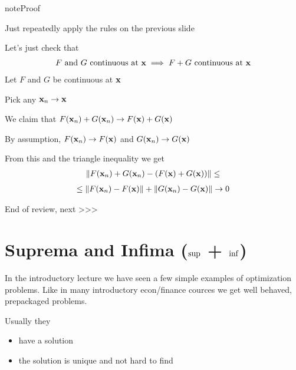 \documentclass[letterpaper,10pt,english]{jupyterBook}
\begin{document}
\begin{sphinxadmonition}{note}{Proof}

\sphinxAtStartPar
Just repeatedly apply the rules on the previous slide

\sphinxAtStartPar
Let’s just check that
\begin{equation*}
\begin{split}
%
\text{$F$ and $G$ continuous at ${\bf x}$}
\implies 
\text{$F + G$ continuous at ${\bf x}$}
%
\end{split}
\end{equation*}
\sphinxAtStartPar
Let \(F\) and \(G\) be continuous at \({\bf x}\)

\sphinxAtStartPar
Pick any \({\bf x}_n \to {\bf x}\)

\sphinxAtStartPar
We claim that
\(F({\bf x}_n) + G({\bf x}_n) \to F({\bf x}) + G({\bf x})\)

\sphinxAtStartPar
By assumption, \(F({\bf x}_n) \to F({\bf x})\) and \(G({\bf x}_n) \to G({\bf x})\)

\sphinxAtStartPar
From this and the triangle inequality we get
\begin{equation*}
\begin{split}
%
\| F({\bf x}_n) + G({\bf x}_n) - (F({\bf x}) + G({\bf x})) \|
\leq 
%
\end{split}
\end{equation*}\begin{equation*}
\begin{split}
%
\leq 
\| F({\bf x}_n) - F({\bf x}) \|
+
\| G({\bf x}_n) - G({\bf x}) \|
\to 0
%
\end{split}
\end{equation*}\end{sphinxadmonition}

\sphinxAtStartPar
End of review,  next >>>


\section{Suprema and Infima (\protect\(\mathrm{sup}\protect\) + \protect\(\mathrm{inf}\protect\))}
\label{\detokenize{06.optimization_fundamentals:suprema-and-infima-mathrm-sup-mathrm-inf}}
\sphinxAtStartPar
In the introductory lecture we have seen a few simple examples of optimization problems. Like in many introductory econ/finance cources
we get well behaved, prepackaged problems.

\sphinxAtStartPar
Usually they
\begin{itemize}
\item {} 
\sphinxAtStartPar
have a solution

\item {} 
\sphinxAtStartPar
the solution is unique and not hard to find

\end{itemize}
\end{document}
